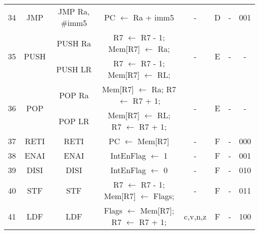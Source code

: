 \begin{table}[t]
{\begin{tabular}{r|c|c|c|c|c|c|c|}
	34& JMP   & JMP Ra, \#imm5      & PC $\leftarrow$ Ra + imm5     & -       & D & -     & 001 \\
	\multirow{2}{*}{35}& \multirow{2}{*}{PUSH}  & PUSH Ra             & R7 $\leftarrow$ R7 - 1; Mem[R7] $\leftarrow$ Ra; & \multirow{2}{*}{-} & \multirow{2}{*}{E} & \multirow{2}{*}{-} & \multirow{2}{*}{-} \\
	  &       & PUSH LR             & R7 $\leftarrow$ R7 - 1; Mem[R7] $\leftarrow$ RL; &   &   &   &   \\
	\multirow{2}{*}{36}& \multirow{2}{*}{POP}   & POP Ra              & Mem[R7] $\leftarrow$ Ra; R7 $\leftarrow$ R7 + 1; & \multirow{2}{*}{-} & \multirow{2}{*}{E} & \multirow{2}{*}{-} & \multirow{2}{*}{-} \\
	  &       & POP LR              & Mem[R7] $\leftarrow$ RL; R7 $\leftarrow$ R7 + 1; &   &   &   &   \\
	37& RETI  & RETI                & PC $\leftarrow$ Mem[R7]       & -       & F & -     & 000 \\
	38& ENAI  & ENAI                & IntEnFlag $\leftarrow$ 1      & -       & F & -     & 001 \\
	39& DISI  & DISI                & IntEnFlag $\leftarrow$ 0      & -       & F & -     & 010 \\
	40& STF   & STF                 & R7 $\leftarrow$ R7 - 1; Mem[R7] $\leftarrow$ Flags; & - & F & - & 011 \\
	41& LDF   & LDF                 & Flags $\leftarrow$ Mem[R7]; R7 $\leftarrow$ R7 + 1; & c,v,n,z & F & - & 100 \\
	\cline{2-8}
\end{tabular}
}
\end{table}